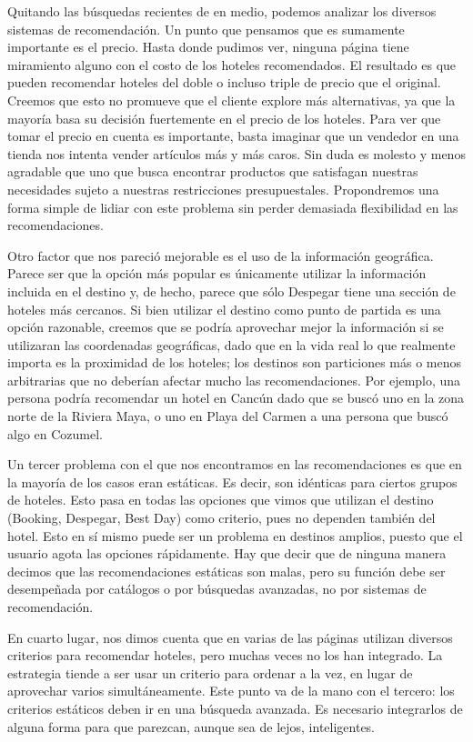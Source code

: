\documentclass[12pt]{report}
\begin{document}
Quitando las búsquedas recientes de en medio, podemos analizar los diversos sistemas de recomendación. Un punto que pensamos que es sumamente importante es el precio. Hasta donde pudimos ver, ninguna página tiene miramiento alguno con el costo de los hoteles recomendados. El resultado es que pueden recomendar hoteles del doble o incluso triple de precio que el original. Creemos que esto no promueve que el cliente explore más alternativas, ya que la mayoría basa su decisión fuertemente en el precio de los hoteles. Para ver que tomar el precio en cuenta es importante, basta imaginar que un vendedor en una tienda nos intenta vender artículos más y más caros. Sin duda es molesto y menos agradable que uno que busca encontrar productos que satisfagan nuestras necesidades sujeto a nuestras restricciones presupuestales. Propondremos una forma simple de lidiar con este problema sin perder demasiada flexibilidad en las recomendaciones.

Otro factor que nos pareció mejorable es el uso de la información geográfica. Parece ser que la opción más popular es únicamente utilizar la información incluida en el destino y, de hecho, parece que sólo Despegar tiene una sección de hoteles más cercanos. Si bien utilizar el destino como punto de partida es una opción razonable, creemos que se podría aprovechar mejor la información si se utilizaran las coordenadas geográficas, dado que en la vida real lo que realmente importa es la proximidad de los hoteles; los destinos son particiones más o menos arbitrarias que no deberían afectar mucho las recomendaciones. Por ejemplo, una persona podría recomendar un hotel en Cancún dado que se buscó uno en la zona norte de la Riviera Maya, o uno en Playa del Carmen a una persona que buscó algo en Cozumel.

Un tercer problema con el que nos encontramos en las recomendaciones es que en la mayoría de los casos eran estáticas. Es decir, son idénticas para ciertos grupos de hoteles. Esto pasa en todas las opciones que vimos que utilizan el destino (Booking, Despegar, Best Day) como criterio, pues no dependen también del hotel. Esto en sí mismo puede ser un problema en destinos amplios, puesto que el usuario agota las opciones rápidamente. Hay que decir que de ninguna manera decimos que las recomendaciones estáticas son malas, pero su función debe ser desempeñada por catálogos o por búsquedas avanzadas, no por sistemas de recomendación.

En cuarto lugar, nos dimos cuenta que en varias de las páginas utilizan diversos criterios para recomendar hoteles, pero muchas veces no los han integrado. La estrategia tiende a ser usar un criterio para ordenar a la vez, en lugar de aprovechar varios simultáneamente. Este punto va de la mano con el tercero: los criterios estáticos deben ir en una búsqueda avanzada. Es necesario integrarlos de alguna forma para que parezcan, aunque sea de lejos, inteligentes.
\end{document}
